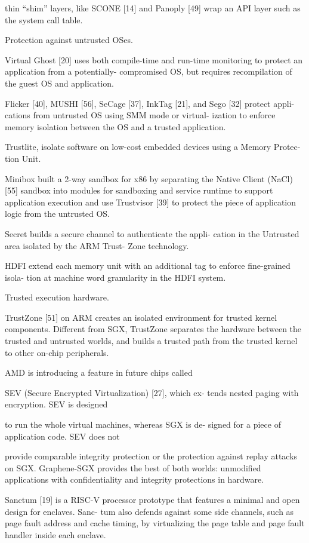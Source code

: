 thin “shim” layers, like SCONE [14] and Panoply [49] wrap 
an API layer such as the system call table.


Protection against untrusted OSes.

Virtual Ghost [20] uses both compile-time and run-time
monitoring to protect an application from a potentially-
compromised OS, but requires recompilation of the
guest OS and application.

Flicker [40], MUSHI [56],
SeCage [37], InkTag [21], and Sego [32] protect appli-
cations from untrusted OS using SMM mode or virtual-
ization to enforce memory isolation between the OS and
a trusted application.

Trustlite, isolate software
on low-cost embedded devices using a Memory Protec-
tion Unit.

Minibox built a 2-way sandbox for x86
by separating the Native Client (NaCl) [55] sandbox into
modules for sandboxing and service runtime to support
application execution and use Trustvisor [39] to protect
the piece of application logic from the untrusted OS.

Secret builds a secure channel to authenticate the appli-
cation in the Untrusted area isolated by the ARM Trust-
Zone technology.

HDFI extend each memory
unit with an additional tag to enforce fine-grained isola-
tion at machine word granularity in the HDFI system.


Trusted execution hardware.

TrustZone [51] on ARM creates an isolated
environment for trusted kernel components. Different
from SGX, TrustZone separates the hardware between
the trusted and untrusted worlds, and builds a trusted path
from the trusted kernel to other on-chip peripherals.

AMD is introducing a feature in future chips called

SEV (Secure Encrypted Virtualization) [27], which ex-
tends nested paging with encryption. SEV is designed

to run the whole virtual machines, whereas SGX is de-
signed for a piece of application code. SEV does not

provide comparable integrity protection or the protection
against replay attacks on SGX. Graphene-SGX provides
the best of both worlds: unmodified applications with
confidentiality and integrity protections in hardware.

Sanctum [19] is a RISC-V processor prototype that
features a minimal and open design for enclaves. Sanc-
tum also defends against some side channels, such as
page fault address and cache timing, by virtualizing the
page table and page fault handler inside each enclave.


